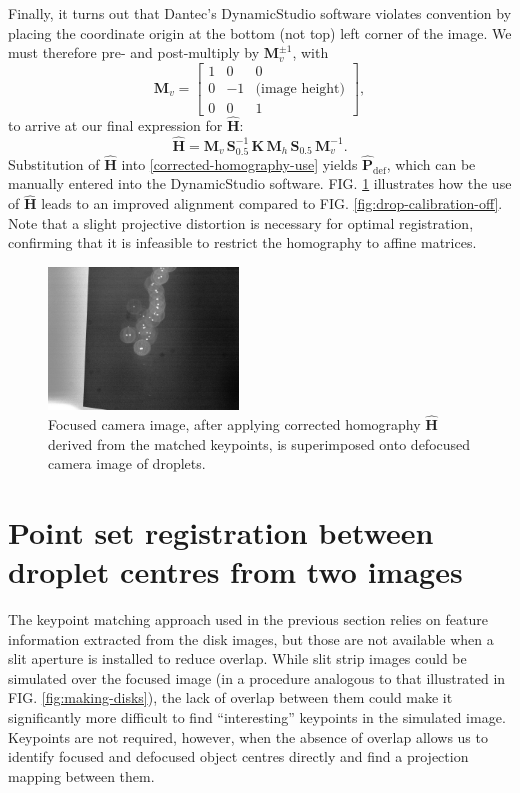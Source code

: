 \documentclass[floatfix,aip,rsi,reprint,graphicx]{revtex4-1}
\begin{document}
Finally, it turns out that Dantec's DynamicStudio software violates convention
by placing the coordinate origin at the bottom (not top) left corner of the
image. We must therefore pre- and post-multiply by $\mathbf{M}_v^{\pm 1}$, with
\begin{equation*}
    \mathbf{M}_v = \left[ \begin{array}{ccc}
            1 & 0 & 0 \\
    0 & -1 & \text{(image height)} \\
            0 & 0 & 1
    \end{array} \right],
\end{equation*}
to arrive at our final expression for $\mathbf{\hat{H}}$:
\begin{equation}
    \mathbf{\hat{H}} = \mathbf{M}_v\, \mathbf{S}_{0.5}^{-1}\, \mathbf{K}\,
    \mathbf{M}_h\, \mathbf{S}_{0.5}\, \mathbf{M}_v^{-1}.
\end{equation}
Substitution of $\mathbf{\hat{H}}$ into \eqref{corrected-homography-use} yields
$\mathbf{\hat{P}}_\text{def}$, which can be manually entered into the
DynamicStudio software. FIG. \ref{fig:drop-calibration-corrected} illustrates
how the use of $\mathbf{\hat{H}}$ leads to an improved alignment compared to
FIG. \ref{fig:drop-calibration-off}. Note that a slight projective distortion
is necessary for optimal registration, confirming that it is infeasible to restrict the homography
to affine matrices.

\begin{figure}
    \centering
    \includegraphics[width=0.45\textwidth]{orb_images/drop-calibration-corrected.jpg}
    \caption{Focused camera image, after applying corrected homography
        $\mathbf{\hat{H}}$ derived from the matched keypoints, is superimposed onto
    defocused camera image of droplets.}
    \label{fig:drop-calibration-corrected}
\end{figure}
\section{Point set registration between droplet centres from two images\label{sec:pointset}}
The keypoint matching approach used in the previous section relies on feature
information extracted from the disk images, but those are not available when a
slit aperture is installed to reduce overlap. While slit strip images could be
simulated over the focused image (in a procedure analogous to that illustrated
in FIG.  \ref{fig:making-disks}), the lack of overlap between them could make it
significantly more difficult to find ``interesting'' keypoints in the simulated
image. Keypoints are not required, however, when the absence of overlap allows
us to identify focused and defocused object centres directly and find a
projection mapping between them.
\end{document}
